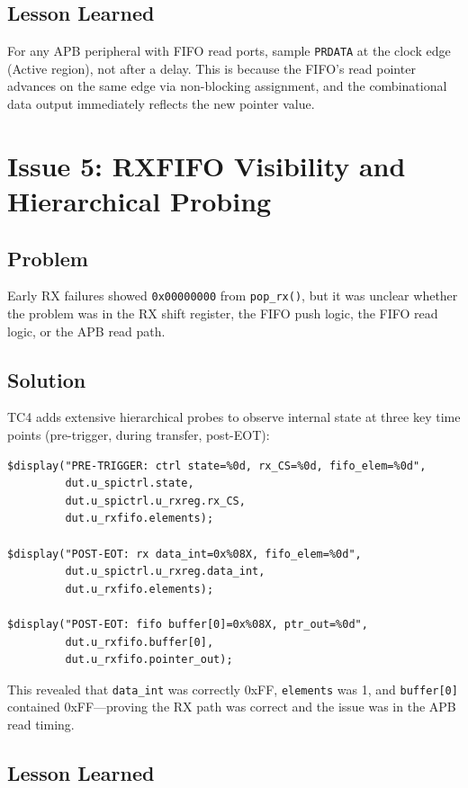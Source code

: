 \subsection{Lesson Learned}

For any APB peripheral with FIFO read ports, sample \texttt{PRDATA} at the clock edge (Active
region), not after a delay. This is because the FIFO's read pointer advances on the same edge
via non-blocking assignment, and the combinational data output immediately reflects the new
pointer value.

\section{Issue 5: RXFIFO Visibility and Hierarchical Probing}

\subsection{Problem}

Early RX failures showed \texttt{0x00000000} from \texttt{pop\_rx()}, but it was unclear
whether the problem was in the RX shift register, the FIFO push logic, the FIFO read logic,
or the APB read path.

\subsection{Solution}

TC4 adds extensive hierarchical probes to observe internal state at three key time points
(pre-trigger, during transfer, post-EOT):

\begin{lstlisting}
$display("PRE-TRIGGER: ctrl state=%0d, rx_CS=%0d, fifo_elem=%0d",
         dut.u_spictrl.state,
         dut.u_spictrl.u_rxreg.rx_CS,
         dut.u_rxfifo.elements);

$display("POST-EOT: rx data_int=0x%08X, fifo_elem=%0d",
         dut.u_spictrl.u_rxreg.data_int,
         dut.u_rxfifo.elements);

$display("POST-EOT: fifo buffer[0]=0x%08X, ptr_out=%0d",
         dut.u_rxfifo.buffer[0],
         dut.u_rxfifo.pointer_out);
\end{lstlisting}

This revealed that \texttt{data\_int} was correctly 0xFF, \texttt{elements} was 1, and
\texttt{buffer[0]} contained 0xFF---proving the RX path was correct and the issue was in the
APB read timing.

\subsection{Lesson Learned}

